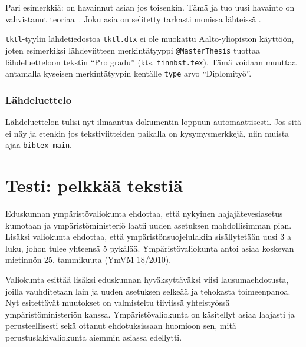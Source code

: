 Pari esimerkkiä:
\citet[s. 21]{RefWorks:doc:601937178f0884cb02a8458c} on havainnut asian jos toisenkin. 
\cite{detect_malicious}
Tämä ja tuo uusi havainto on vahvistanut teoriaa~\citep[s. 22]{detect_malicious}.
Joku asia on selitetty tarkasti monissa lähteissä 
\citep[katso][s. 27]{RefWorks:doc:601937178f0884cb02a8458c}.

\verb!tktl!-tyylin lähdetiedostoa \verb!tktl.dtx! ei ole
muokattu Aalto-yliopiston käyttöön, joten esimerkiksi 
lähdeviitteen merkintätyyppi \verb!@MasterThesis! tuottaa lähdeluetteloon
tekstin ``Pro gradu'' (kts. \verb!finnbst.tex!).
Tämä voidaan muuttaa antamalla kyseisen merkintätyypin kentälle
\verb!type! arvo ``Diplomityö''. 

\subsubsection{Lähdeluettelo}
\label{sec:esimlahdeluettelo}

Lähdeluettelon tulisi nyt ilmaantua dokumentin loppuun
automaattisesti. Jos sitä ei näy ja etenkin jos tekstiviitteiden
paikalla on kysymysmerkkejä, niin muista ajaa \verb!bibtex main!.


%

\section{Testi: pelkkää tekstiä}

Eduskunnan ympäristövaliokunta ehdottaa, että nykyinen
hajajätevesiasetus kumotaan ja ympäristöministeriö laatii uuden
asetuksen mahdollisimman pian. Lisäksi valiokunta ehdottaa, että
ympäristönsuojelulakiin sisällytetään uusi 3 a luku, johon tulee
yhteensä 5 pykälää. Ympäristövaliokunta antoi asiaa koskevan mietinnön
25. tammikuuta (YmVM 18/2010).

Valiokunta esittää lisäksi eduskunnan hyväksyttäväksi viisi
lausumaehdotusta, joilla vauhditetaan lain ja uuden asetuksen selkeää
ja tehokasta toimeenpanoa. Nyt esitettävät muutokset on valmisteltu
tiiviissä yhteistyössä ympäristöministeriön
kanssa. Ympäristövaliokunta on käsitellyt asiaa laajasti ja
perusteellisesti sekä ottanut ehdotuksissaan huomioon sen, mitä
perustuslakivaliokunta aiemmin asiassa edellytti.

